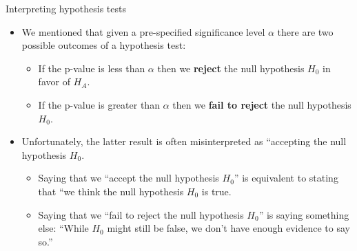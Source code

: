 \documentclass[
  ignorenonframetext,
]{beamer}
\providecommand{\tightlist}{%
  \setlength{\itemsep}{0pt}\setlength{\parskip}{0pt}}
\begin{document}
\begin{frame}{Interpreting hypothesis tests}
\protect\hypertarget{interpreting-hypothesis-tests-1}{}
\begin{itemize}
\item
  We mentioned that given a pre-specified significance level \(\alpha\)
  there are two possible outcomes of a hypothesis test:

  \begin{itemize}
  \tightlist
  \item
    If the p-value is less than \(\alpha\) then we \textbf{reject} the
    null hypothesis \(H_0\) in favor of \(H_A\).
  \item
    If the p-value is greater than \(\alpha\) then we \textbf{fail to
    reject} the null hypothesis \(H_0\).
  \end{itemize}
\item
  Unfortunately, the latter result is often misinterpreted as
  ``accepting the null hypothesis \(H_0\).

  \begin{itemize}
  \tightlist
  \item
    Saying that we ``accept the null hypothesis \(H_0\)'' is equivalent
    to stating that ``we think the null hypothesis \(H_0\) is true.
  \item
    Saying that we ``fail to reject the null hypothesis \(H_0\)'' is
    saying something else: ``While \(H_0\) might still be false, we
    don't have enough evidence to say so.''
  \end{itemize}
\end{itemize}
\end{frame}
\end{document}
